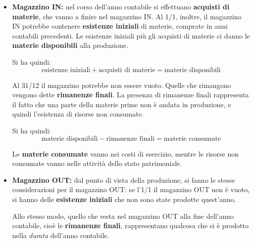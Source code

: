 \documentclass[a4paper,11pt]{article}
\begin{document}
\begin{itemize}
	\item \textbf{Magazzino IN:}
nel corso dell'anno contabile si effettuano \textbf{acquisti di materie}, che vanno a finire nel magazzino IN.
Al 1/1, inoltre, il magazzino IN potrebbe contenere \textbf{esistenze iniziali} di materie, comprate in anni contabili precedenti.
Le esistenze iniziali più gli acquisti di materie ci danno le \textbf{materie disponibili} alla produzione.

Si ha quindi:
$$
\text{esistenze iniziali} + \text{acquisti di materie} = \text{materie disponibili}
$$

Al 31/12 il magazzino potrebbe non essere vuoto.
Quelle che rimangono vengono dette \textbf{rimanenze finali}.
La presenza di rimanenze finali rappresenta il fatto che una parte della materie prime non è andata in produzione, e quindi l'esistenza di risorse non consumate.

Si ha quindi:
$$
\text{materie disponibili} - \text{rimanenze finali} = \text{materie consumate}
$$

Le \textbf{materie consumate} vanno nei costi di esercizio, mentre le risorse non consumate vanno nelle attività dello stato patrimoniale.

\item \textbf{Magazzino OUT:}
	dal punto di vista della produzione, si fanno le stesse considerazioni per il magazzino OUT: se l'1/1 il magazzino OUT non è vuoto, si hanno delle \textbf{esistenze iniziali} che non sono state prodotte quest'anno.

	Allo stesso modo, quello che resta nel magazzino OUT alla fine dell'anno contabile, cioè le \textbf{rimanenze finali}, rappresentano qualcosa che si è prodotto nella \textit{durata} dell'anno contabile.

\end{itemize}
\end{document}
